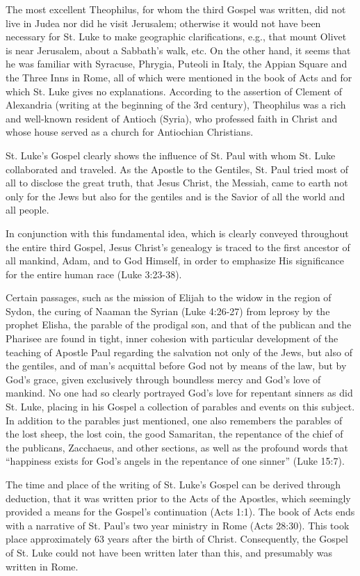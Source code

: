 The most excellent Theophilus, for whom the third Gospel was written, did not live in Judea nor did he visit Jerusalem; otherwise it would not have been necessary for St. Luke to make geographic clarifications, e.g., that mount Olivet is near Jerusalem, about a Sabbath's walk, etc. On the other hand, it seems that he was familiar with Syracuse, Phrygia, Puteoli in Italy, the Appian Square and the Three Inns in Rome, all of which were mentioned in the book of Acts and for which St. Luke gives no explanations. According to the assertion of Clement of Alexandria (writing at the beginning of the 3rd century), Theophilus was a rich and well-known resident of Antioch (Syria), who professed faith in Christ and whose house served as a church for Antiochian Christians.

St. Luke's Gospel clearly shows the influence of St. Paul with whom St. Luke collaborated and traveled. As the Apostle to the Gentiles, St. Paul tried most of all to disclose the great truth, that Jesus Christ, the Messiah, came to earth not only for the Jews but also for the gentiles and is the Savior of all the world and all people.

In conjunction with this fundamental idea, which is clearly conveyed throughout the entire third Gospel, Jesus Christ's genealogy is traced to the first ancestor of all mankind, Adam, and to God Himself, in order to emphasize His significance for the entire human race (Luke 3:23-38).

Certain passages, such as the mission of Elijah to the widow in the region of Sydon, the curing of Naaman the Syrian (Luke 4:26-27) from leprosy by the prophet Elisha, the parable of the prodigal son, and that of the publican and the Pharisee are found in tight, inner cohesion with particular development of the teaching of Apostle Paul regarding the salvation not only of the Jews, but also of the gentiles, and of man's acquittal before God not by means of the law, but by God's grace, given exclusively through boundless mercy and God's love of mankind. No one had so clearly portrayed God's love for repentant sinners as did St. Luke, placing in his Gospel a collection of parables and events on this subject. In addition to the parables just mentioned, one also remembers the parables of the lost sheep, the lost coin, the good Samaritan, the repentance of the chief of the publicans, Zacchaeus, and other sections, as well as the profound words that ``happiness exists for God's angels in the repentance of one sinner'' (Luke 15:7).

The time and place of the writing of St. Luke's Gospel can be derived through deduction, that it was written prior to the Acts of the Apostles, which seemingly provided a means for the Gospel's continuation (Acts 1:1). The book of Acts ends with a narrative of St. Paul's two year ministry in Rome (Acts 28:30). This took place approximately 63 years after the birth of Christ. Consequently, the Gospel of St. Luke could not have been written later than this, and presumably was written in Rome.

